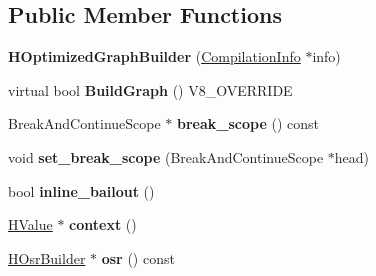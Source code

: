 \subsection*{Public Member Functions}
\begin{DoxyCompactItemize}
\item 
\hypertarget{classv8_1_1internal_1_1_h_optimized_graph_builder_a38e496b79785a0f8e10335ce4280b95c}{}{\bfseries H\+Optimized\+Graph\+Builder} (\hyperlink{classv8_1_1internal_1_1_compilation_info}{Compilation\+Info} $\ast$info)\label{classv8_1_1internal_1_1_h_optimized_graph_builder_a38e496b79785a0f8e10335ce4280b95c}

\item 
\hypertarget{classv8_1_1internal_1_1_h_optimized_graph_builder_a0e9c62a71a3a4cfb0dde25efd71a8076}{}virtual bool {\bfseries Build\+Graph} () V8\+\_\+\+O\+V\+E\+R\+R\+I\+D\+E\label{classv8_1_1internal_1_1_h_optimized_graph_builder_a0e9c62a71a3a4cfb0dde25efd71a8076}

\item 
\hypertarget{classv8_1_1internal_1_1_h_optimized_graph_builder_a6480d2f7867f824dd075714f53b64993}{}Break\+And\+Continue\+Scope $\ast$ {\bfseries break\+\_\+scope} () const \label{classv8_1_1internal_1_1_h_optimized_graph_builder_a6480d2f7867f824dd075714f53b64993}

\item 
\hypertarget{classv8_1_1internal_1_1_h_optimized_graph_builder_a877c5a683bfcdfa9b40f7e4cb2b68d94}{}void {\bfseries set\+\_\+break\+\_\+scope} (Break\+And\+Continue\+Scope $\ast$head)\label{classv8_1_1internal_1_1_h_optimized_graph_builder_a877c5a683bfcdfa9b40f7e4cb2b68d94}

\item 
\hypertarget{classv8_1_1internal_1_1_h_optimized_graph_builder_aa4d8026dd5a4ff116a05e17474b27495}{}bool {\bfseries inline\+\_\+bailout} ()\label{classv8_1_1internal_1_1_h_optimized_graph_builder_aa4d8026dd5a4ff116a05e17474b27495}

\item 
\hypertarget{classv8_1_1internal_1_1_h_optimized_graph_builder_a5a47e8cf965f365eaffcbbad219c20f9}{}\hyperlink{classv8_1_1internal_1_1_h_value}{H\+Value} $\ast$ {\bfseries context} ()\label{classv8_1_1internal_1_1_h_optimized_graph_builder_a5a47e8cf965f365eaffcbbad219c20f9}

\item 
\hypertarget{classv8_1_1internal_1_1_h_optimized_graph_builder_a705239d69f3f4e7720cf1aad0541d2b4}{}\hyperlink{classv8_1_1internal_1_1_h_osr_builder}{H\+Osr\+Builder} $\ast$ {\bfseries osr} () const \label{classv8_1_1internal_1_1_h_optimized_graph_builder_a705239d69f3f4e7720cf1aad0541d2b4}


\end{DoxyCompactItemize}
